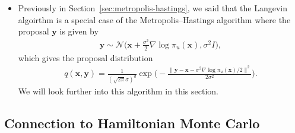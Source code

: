 \documentclass[10pt]{article}
\newcommand{\ve}[1]{\mathbf{#1}}
\newcommand{\mcal}[1]{\mathcal{#1}}
\begin{document}
\begin{itemize}
  \item Previously in Section~\ref{sec:metropolis-hastings}, we said that the Langevin algoirthm is a special case of the Metropolis--Hastings algorithm where the proposal $\ve{y}$ is given by
  \begin{align*}
    \ve{y} \sim \mcal{N}\bigg( \ve{x} + \frac{\sigma^2}{2} \nabla \log \pi_u(\ve{x}), \sigma^2 I \bigg),
  \end{align*}
  which gives the proposal distribution
  \begin{align*}
    q(\ve{x},\ve{y}) = \frac{1}{ (\sqrt{2\pi} \sigma)^d } \exp\bigg( - \frac{ \| \ve{y} - \ve{x} - \sigma^2 \nabla \log \pi_u(\ve{x})/2 \|^2}{2 \sigma^2} \bigg).
  \end{align*}
  We will look further into this algorithm in this section.
\end{itemize}

\subsection{Connection to Hamiltonian Monte Carlo}
\end{document}
